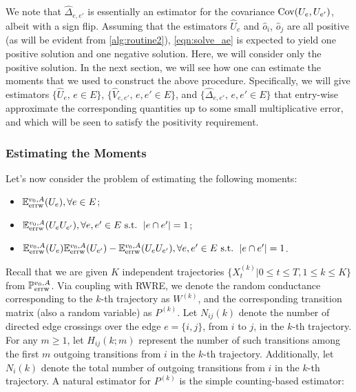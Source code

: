 \documentclass[a4paper, 11pt]{article}
\renewcommand{\P}{\mathbb{P}}
\newcommand{\E}{\mathbb{E}}
\newcommand{\Eerrw}{\E_{\textnormal{errw}}}
\newcommand{\Perrw}{\P_{\textnormal{errw}}}
\newcommand{\covar}{\textnormal{Cov}}
\begin{document}
We note that $\hat{\Delta}_{e,e'}$ is essentially an estimator for the covariance $\covar(U_e, U_{e'})$, albeit with a sign flip. Assuming that the estimators $\hat{U}_e$ and $\hat{o}_i$, $\hat{o}_j$ are all positive (as will be evident from \cref{alg:routine2}), \cref{eqn:solve_ae} is expected to yield one positive solution and one negative solution. Here, we will consider only the positive solution. In the next section, we will see how one can estimate the moments that we used to construct the above procedure. Specifically, we will give estimators 
$\{\hat{U}_e,\,e\in E\}$, $\{\hat{V}_{e,e'},\, e,e'\in E\}$, and $\{\hat{\Delta}_{e,e'},\,e,e'\in E\}$
that entry-wise approximate the corresponding quantities up to some small multiplicative error, 
and which will be seen to satisfy the positivity requirement.

\subsubsection{Estimating the Moments}  \label{sec:estimatingmoments}

Let's now consider the problem of estimating the following moments: 
\begin{itemize}
\item[i.] $\Eerrw^{v_0,A}(U_e), \forall e\in E$;
\item[ii.] $\Eerrw^{v_0,A}(U_e U_{e'}), \forall e,e'\in E\text{ s.t. }\,|e\cap e'|=1$;
\item[iii.] $\Eerrw^{v_0,A}(U_e)\Eerrw^{v_0,A}(U_{e'})-\Eerrw^{v_0,A}(U_eU_{e'}), \forall e,e'\in E\text{ s.t. }\,|e\cap e'|=1$.
\end{itemize}
Recall that we are given $K$ independent trajectories $\{X_t^{(k)}|0 \le t\leq T, 1 \le k\leq K\}$ from $\Perrw^{v_0, A}$. Via coupling with RWRE, we denote the random conductance corresponding to the $k$-th trajectory as $W^{(k)}$, and the corresponding transition matrix (also a random variable) as $P^{(k)}$. Let \(N_{ij}(k)\) denote the number of directed edge crossings over the edge \(e = \{i,j\}\), from \(i\) to \(j\), in the \(k\)-th trajectory. For any 
\(m \ge 1\),
let \(H_{ij}(k; m)\) represent the number of such transitions among the first \(m\) outgoing transitions from \(i\) in the \(k\)-th trajectory. Additionally, let \(N_i(k)\) denote the total number of outgoing transitions from \(i\) in the \(k\)-th trajectory. A natural estimator for $P^{(k)}$ is the simple counting-based estimator: 
\end{document}

